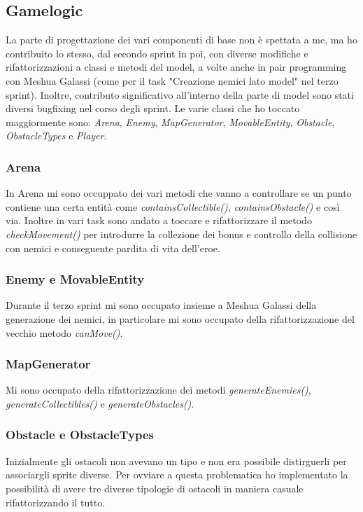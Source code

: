 \subsection{Gamelogic}
La parte di progettazione dei vari componenti di base non è spettata a me, ma ho contribuito lo stesso, dal secondo sprint in poi, con diverse modifiche e rifattorizzazioni a classi e metodi del model, a volte anche in pair programming con Meshua Galassi (come per il task "Creazione nemici lato model" nel terzo sprint).
Inoltre, contributo significativo all'interno della parte di model sono stati diversi bugfixing nel corso degli sprint.
Le varie classi che ho toccato maggiormente sono: \textit{Arena}, \textit{Enemy}, \textit{MapGenerator}, \textit{MovableEntity}, \textit{Obstacle}, \textit{ObstacleTypes} e \textit{Player}.

\subsubsection{Arena}
In Arena mi sono occuppato dei vari metodi che vanno a controllare se un punto contiene una certa entità come \textit{containsCollectible()}, \textit{containsObstacle()} e così via.
Inoltre in vari task sono andato a toccare e rifattorizzare il metodo \textit{checkMovement()} per introdurre la collezione dei bonus e controllo della collisione con nemici e conseguente pardita di vita dell'eroe.

\subsubsection{Enemy e MovableEntity}
Durante il terzo sprint mi sono occupato insieme a Meshua Galassi della generazione dei nemici, in particolare mi sono occupato della rifattorizzazione del vecchio metodo \textit{canMove()}.

\subsubsection{MapGenerator}
Mi sono occupato della rifattorizzazione dei metodi \textit{generateEnemies()}, \textit{generateCollectibles()} e \textit{generateObstacles()}.

\subsubsection{Obstacle e ObstacleTypes}
Inizialmente gli ostacoli non avevano un tipo e non era possibile distirguerli per associargli sprite diverse.
Per ovviare a questa problematica ho implementato la possibilità di avere tre diverse tipologie di ostacoli in maniera casuale rifattorizzando il tutto.

